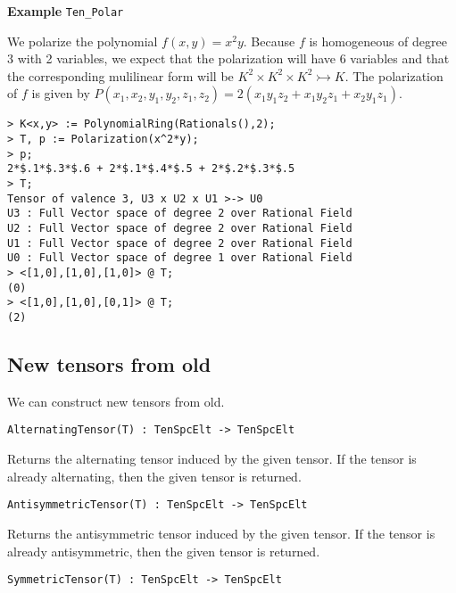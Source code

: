 \medskip
\begin{framed} {\bf Example} {\tt Ten\_Polar}\\
{\small We polarize the polynomial $f(x,y)=x^2y$. 
Because $f$ is homogeneous of degree 3 with 2 variables, we expect that the polarization will have 6 variables and that the corresponding mulilinear form will be $K^2\times K^2\times K^2\rightarrowtail K$.
The polarization of $f$ is given by $P(x_1,x_2,y_1,y_2,z_1,z_2 ) = 2 (x_1y_1z_2 + x_1y_2z_1 + x_2y_1z_1)$.
\begin{lstlisting}[frame=single,basicstyle=\ttfamily\color{black!30!
teal},backgroundcolor=\color{white!70!gray}]
> K<x,y> := PolynomialRing(Rationals(),2);
> T, p := Polarization(x^2*y);
> p;
2*$.1*$.3*$.6 + 2*$.1*$.4*$.5 + 2*$.2*$.3*$.5
> T;
Tensor of valence 3, U3 x U2 x U1 >-> U0
U3 : Full Vector space of degree 2 over Rational Field
U2 : Full Vector space of degree 2 over Rational Field
U1 : Full Vector space of degree 2 over Rational Field
U0 : Full Vector space of degree 1 over Rational Field
> <[1,0],[1,0],[1,0]> @ T;
(0)
> <[1,0],[1,0],[0,1]> @ T;
(2)
\end{lstlisting}
}
\end{framed}


\subsection{New tensors from old}
We can construct new tensors from old.

\color{blue}
{\small \begin{verbatim}
AlternatingTensor(T) : TenSpcElt -> TenSpcElt
\end{verbatim} }
\color{black}

Returns the alternating tensor induced by the given tensor. If 
the tensor is already alternating, then the given tensor is returned.

\color{blue}
{\small \begin{verbatim}
AntisymmetricTensor(T) : TenSpcElt -> TenSpcElt
\end{verbatim} }
\color{black}

Returns the antisymmetric tensor induced by the given tensor. If 
the tensor is already antisymmetric, then the given tensor is returned.

\color{blue}
{\small \begin{verbatim}
SymmetricTensor(T) : TenSpcElt -> TenSpcElt
\end{verbatim} }
\color{black}

